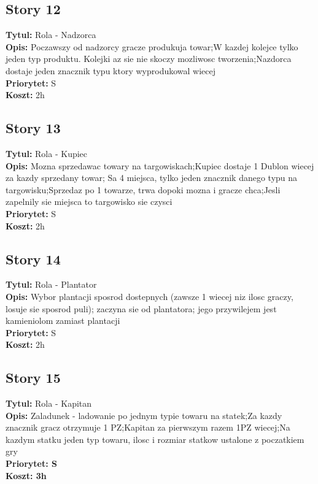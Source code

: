 \documentclass[12pt]{article}
\begin{document}
\subsection{Story 12 }
\textbf{Tytul:} Rola - Nadzorca \\
\textbf{Opis:} Poczawszy od nadzorcy gracze produkuja towar;W kazdej kolejce
tylko jeden typ produktu. Kolejki az sie nie skoczy mozliwosc tworzenia;Nazdorca
dostaje jeden znacznik typu ktory wyprodukowal wiecej\\
\textbf{Priorytet:} S \\
\textbf{Koszt:} 2h \\

\subsection{Story 13}
\textbf{Tytul:} Rola - Kupiec \\
\textbf{Opis:} Mozna sprzedawac towary na targowiskach;Kupiec dostaje 1 Dublon
wiecej za kazdy sprzedany towar; Sa 4 miejsca, tylko jeden znacznik danego typu
na targowisku;Sprzedaz po 1 towarze, trwa dopoki mozna i gracze chca;Jesli
zapelnily sie miejsca to targowisko sie czysci \\
\textbf{Priorytet:} S \\
\textbf{Koszt:} 2h \\

\subsection{Story 14}
\textbf{Tytul:} Rola - Plantator \\
\textbf{Opis:} Wybor plantacji sposrod dostepnych (zawsze 1 wiecej niz ilosc
graczy, losuje sie sposrod puli); zaczyna sie od plantatora; jego
przywilejem jest kamieniolom zamiast plantacji \\
\textbf{Priorytet:} S \\
\textbf{Koszt:} 2h \\

\subsection{Story 15 }
\textbf{Tytul:} Rola - Kapitan \\
\textbf{Opis:} Zaladunek - ladowanie po jednym typie towaru na statek;Za kazdy
znacznik gracz otrzymuje 1 PZ;Kapitan za pierwszym razem 1PZ wiecej;Na kazdym
statku jeden typ towaru, ilosc i rozmiar statkow ustalone z poczatkiem gry \\
\textbf{Priorytet: S}  \\
\textbf{Koszt: 3h}  \\
\end{document}
